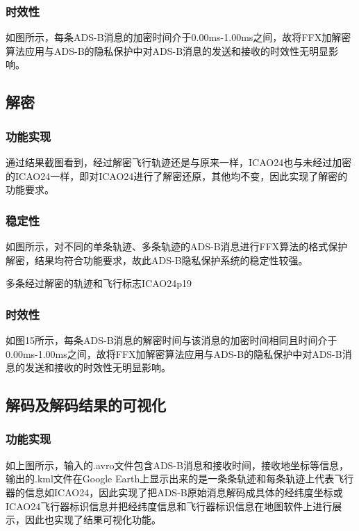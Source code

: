 \subsubsection{时效性}
如图所示，每条ADS-B消息的加密时间介于0.00ms-1.00ms之间，故将FFX加解密算法应用与ADS-B的隐私保护中对ADS-B消息的发送和接收的时效性无明显影响。


\subsection{解密}
\subsubsection{功能实现}
通过结果截图看到，经过解密飞行轨迹还是与原来一样，ICAO24也与未经过加密的ICAO24一样，即对ICAO24进行了解密还原，其他均不变，因此实现了解密的功能要求。


\subsubsection{稳定性}
如图所示，对不同的单条轨迹、多条轨迹的ADS-B消息进行FFX算法的格式保护解密，结果均符合功能要求，故此ADS-B隐私保护系统的稳定性较强。

\begin{pics}[h]{多条经过解密的轨迹和飞行标志ICAO24}{p19}
\end{pics}

\subsubsection{时效性}
如图15所示，每条ADS-B消息的解密时间与该消息的加密时间相同且时间介于0.00ms-1.00ms之间，故将FFX加解密算法应用与ADS-B的隐私保护中对ADS-B消息的发送和接收的时效性无明显影响。
\subsection{解码及解码结果的可视化}
\subsubsection{功能实现}
如上图所示，输入的.avro文件包含ADS-B消息和接收时间，接收地坐标等信息，输出的.kml文件在Google Earth上显示出来的是一条条轨迹和每条轨迹上代表飞行器的信息如ICAO24，因此实现了把ADS-B原始消息解码成具体的经纬度坐标或ICAO24飞行器标识信息并把经纬度信息和飞行器标识信息在地图软件上进行展示，因此也实现了结果可视化功能。

